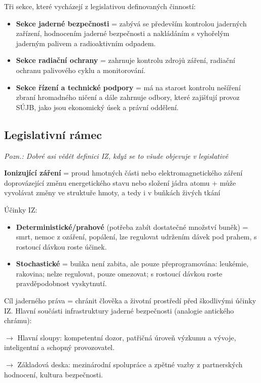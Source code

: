 Tři sekce, které vycházejí z legislativou definovaných činností:

\begin{itemize}
    \item \textbf{Sekce jaderné bezpečnosti} = zabývá se především kontrolou jaderných zařízení, hodnocením jaderné bezpečnosti a nakládáním s vyhořelým jaderným palivem a radioaktivním odpadem.
    \item \textbf{Sekce radiační ochrany} = zahrnuje kontrolu zdrojů záření, radiační ochranu palivového cyklu a monitorování. 
    \item \textbf{Sekce řízení a technické podpory} = má na starost kontrolu nešíření zbraní hromadného ničení a dále zahrnuje odbory, které zajišťují provoz SÚJB, jako jsou ekonomický úsek a právní oddělení.
\end{itemize}

\subsection{Legislativní rámec}

\textit{Pozn.: Dobré asi vědět definici IZ, když se to všude objevuje v legislativě}

\textbf{Ionizující záření} = proud hmotných části nebo elektromagnetického záření doprovázející změnu energetického stavu nebo složení jádra atomu + může vyvolávat změny ve struktuře hmoty, a tedy i v buňkách živých tkání

Účinky IZ:

\begin{itemize}
	\item \textbf{Deterministické/prahové} (potřeba zabít dostatečné množství buněk) = smrt, nemoc z ozáření, popálení, lze regulovat udržením dávek pod prahem, s rostoucí dávkou roste účinek.
	\item \textbf{Stochastické} = buňka není zabita, ale pouze přeprogramována: leukémie, rakovina; nelze regulovat, pouze omezovat; s rostoucí dávkou roste pravděpodobnost vyskytnutí.
\end{itemize}

Cíl jaderného práva = chránit člověka a životní prostředí před škodlivými účinky IZ. Hlavní součásti infrastruktury jaderné bezpečnosti (analogie antického chrámu):

$\rightarrow$ Hlavní sloupy: kompetentní dozor, patřičná úroveň výzkumu a vývoje, inteligentní a schopný provozovatel.

$\rightarrow$ Základová deska: mezinárodní spolupráce a zpětné vazby z partnerských hodnocení, kultura bezpečnosti.

